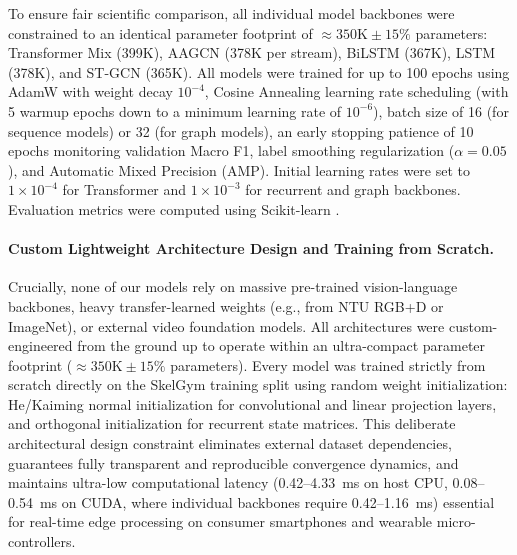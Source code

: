 \documentclass[preprint,12pt]{elsarticle}
\begin{document}
To ensure fair scientific comparison, all individual model backbones were constrained to an identical parameter footprint of $\approx 350\text{K} \pm 15\%$ parameters: Transformer Mix (399K), AAGCN (378K per stream), BiLSTM (367K), LSTM (378K), and ST-GCN (365K). All models were trained for up to 100 epochs using AdamW \cite{loshchilov2018} with weight decay $10^{-4}$, Cosine Annealing learning rate scheduling (with 5 warmup epochs down to a minimum learning rate of $10^{-6}$), batch size of 16 (for sequence models) or 32 (for graph models), an early stopping patience of 10 epochs monitoring validation Macro F1, label smoothing regularization \cite{szegedy2016} ($\alpha = 0.05$), and Automatic Mixed Precision (AMP). Initial learning rates were set to $1 \times 10^{-4}$ for Transformer and $1 \times 10^{-3}$ for recurrent and graph backbones. Evaluation metrics were computed using Scikit-learn \cite{pedregosa2011}.

\paragraph{Custom Lightweight Architecture Design and Training from Scratch.} Crucially, none of our models rely on massive pre-trained vision-language backbones, heavy transfer-learned weights (e.g., from NTU RGB+D or ImageNet), or external video foundation models. All architectures were custom-engineered from the ground up to operate within an ultra-compact parameter footprint ($\approx 350\text{K} \pm 15\%$ parameters). Every model was trained strictly from scratch directly on the SkelGym training split using random weight initialization: He/Kaiming normal initialization \cite{he2015delving} for convolutional and linear projection layers, and orthogonal initialization for recurrent state matrices. This deliberate architectural design constraint eliminates external dataset dependencies, guarantees fully transparent and reproducible convergence dynamics, and maintains ultra-low computational latency (0.42--4.33~ms on host CPU, 0.08--0.54~ms on CUDA, where individual backbones require 0.42--1.16~ms) essential for real-time edge processing on consumer smartphones and wearable micro-controllers.
\end{document}
